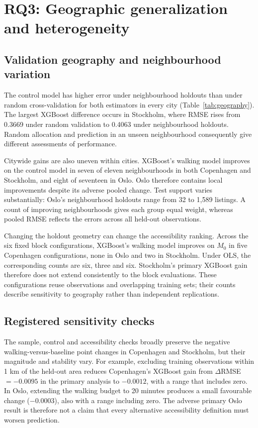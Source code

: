 \documentclass[11pt,a4paper,oneside,openany]{memoir}
\begin{document}
\section{RQ3: Geographic generalization and heterogeneity}
\label{sec:rq3-results}
\subsection{Validation geography and neighbourhood variation}
The control model has higher error under neighbourhood holdouts than under
random cross-validation for both estimators in every city
(Table~\ref{tab:geography}). The largest XGBoost difference occurs in Stockholm,
where RMSE rises from 0.3669 under random validation to 0.4063 under
neighbourhood holdouts. Random allocation and prediction in an unseen
neighbourhood consequently give different assessments of performance.



Citywide gains are also uneven within cities. XGBoost's walking model improves
on the control model in seven of eleven neighbourhoods in both Copenhagen and
Stockholm, and eight of seventeen in Oslo. Oslo therefore contains local
improvements despite its adverse pooled change. Test support varies
substantially: Oslo's neighbourhood holdouts range from 32 to 1,589 listings.
A count of improving neighbourhoods gives each group equal weight, whereas
pooled RMSE reflects the errors across all held-out observations.

Changing the holdout geometry can change the accessibility ranking. Across the
six fixed block configurations, XGBoost's walking model improves on $M_0$ in
five Copenhagen configurations, none in Oslo and two in Stockholm. Under OLS,
the corresponding counts are six, three and six. Stockholm's primary XGBoost
gain therefore does not extend consistently to the block evaluations. These
configurations reuse observations and overlapping training sets; their counts
describe sensitivity to geography rather than independent replications.

\subsection{Registered sensitivity checks}
The sample, control and accessibility checks broadly preserve the negative
walking-versus-baseline point changes in Copenhagen and Stockholm, but their
magnitude and stability vary. For example, excluding training observations
within 1 km of the held-out area reduces Copenhagen's XGBoost gain from
$\Delta$RMSE $=-0.0095$ in the primary analysis to $-0.0012$, with a range that
includes zero. In Oslo, extending the walking budget to 20 minutes produces
a small favourable change ($-0.0003$), also with a range including zero.
The adverse primary Oslo result is therefore not a claim that every alternative
accessibility definition must worsen prediction.
\end{document}
